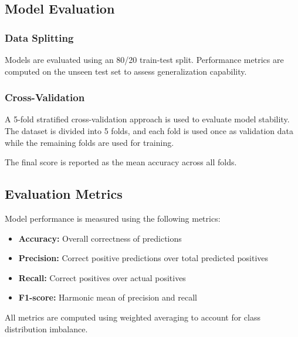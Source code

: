 \subsection{Model Evaluation}

\subsubsection{Data Splitting}

Models are evaluated using an 80/20 train-test split. Performance metrics are computed on the unseen test set to assess generalization capability.

\subsubsection{Cross-Validation}

A 5-fold stratified cross-validation approach is used to evaluate model stability. The dataset is divided into 5 folds, and each fold is used once as validation data while the remaining folds are used for training.

The final score is reported as the mean accuracy across all folds.

\subsection{Evaluation Metrics}

Model performance is measured using the following metrics:

\begin{itemize}
\item \textbf{Accuracy:} Overall correctness of predictions
\item \textbf{Precision:} Correct positive predictions over total predicted positives
\item \textbf{Recall:} Correct positives over actual positives
\item \textbf{F1-score:} Harmonic mean of precision and recall
\end{itemize}

All metrics are computed using weighted averaging to account for class distribution imbalance.